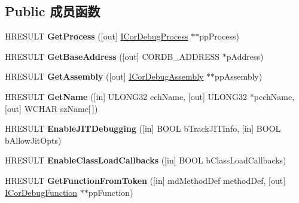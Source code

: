 \subsection*{Public 成员函数}
\begin{DoxyCompactItemize}
\item 
\mbox{\label{interface_i_cor_debug_module_a891c7aadcdfe6a4eb0e368be1897e541}} 
H\+R\+E\+S\+U\+LT {\bfseries Get\+Process} (\mbox{[}out\mbox{]} \hyperlink{interface_i_cor_debug_process}{I\+Cor\+Debug\+Process} $\ast$$\ast$pp\+Process)
\item 
\mbox{\label{interface_i_cor_debug_module_a62264c4567900f8e143ffedbec5b3b1b}} 
H\+R\+E\+S\+U\+LT {\bfseries Get\+Base\+Address} (\mbox{[}out\mbox{]} C\+O\+R\+D\+B\+\_\+\+A\+D\+D\+R\+E\+SS $\ast$p\+Address)
\item 
\mbox{\label{interface_i_cor_debug_module_afe94796059444959e7c36de14bd81e0e}} 
H\+R\+E\+S\+U\+LT {\bfseries Get\+Assembly} (\mbox{[}out\mbox{]} \hyperlink{interface_i_cor_debug_assembly}{I\+Cor\+Debug\+Assembly} $\ast$$\ast$pp\+Assembly)
\item 
\mbox{\label{interface_i_cor_debug_module_a249b4ea4feac19e49e9559f74746228b}} 
H\+R\+E\+S\+U\+LT {\bfseries Get\+Name} (\mbox{[}in\mbox{]} U\+L\+O\+N\+G32 cch\+Name, \mbox{[}out\mbox{]} U\+L\+O\+N\+G32 $\ast$pcch\+Name, \mbox{[}out\mbox{]} W\+C\+H\+AR sz\+Name\mbox{[}$\,$\mbox{]})
\item 
\mbox{\label{interface_i_cor_debug_module_a6409058b796d7cd86926d2c95a0a2ddb}} 
H\+R\+E\+S\+U\+LT {\bfseries Enable\+J\+I\+T\+Debugging} (\mbox{[}in\mbox{]} B\+O\+OL b\+Track\+J\+I\+T\+Info, \mbox{[}in\mbox{]} B\+O\+OL b\+Allow\+Jit\+Opts)
\item 
\mbox{\label{interface_i_cor_debug_module_aaeb23a0407bddf7fc540bacd7be5435b}} 
H\+R\+E\+S\+U\+LT {\bfseries Enable\+Class\+Load\+Callbacks} (\mbox{[}in\mbox{]} B\+O\+OL b\+Class\+Load\+Callbacks)
\item 
\mbox{\label{interface_i_cor_debug_module_a5bfaff259e96b5918a3a258f671c2e07}} 
H\+R\+E\+S\+U\+LT {\bfseries Get\+Function\+From\+Token} (\mbox{[}in\mbox{]} md\+Method\+Def method\+Def, \mbox{[}out\mbox{]} \hyperlink{interface_i_cor_debug_function}{I\+Cor\+Debug\+Function} $\ast$$\ast$pp\+Function)
$$
\end{DoxyCompactItemize}

